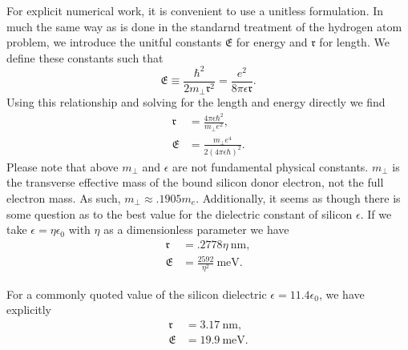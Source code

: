 For explicit numerical work, it is convenient to use a unitless formulation. In
much the same way as is done in the standarnd treatment of the hydrogen atom
problem, we introduce the unitful constants $\mathfrak{E}$ for energy and $\mathfrak{r}$ for
length. We define these constants such that
\begin{equation}
  \mathfrak{E}
  \equiv
  \frac{\hbar^2}{2 m_\perp \mathfrak{r}^2}
  =
  \frac{e^2}{8\pi \epsilon \mathfrak{r}}.
\end{equation}
Using this relationship and solving for the length and energy directly we find
\begin{align}
  \mathfrak{r}
  & =
  \frac{4\pi \epsilon \hbar^2}{m_\perp e^2},
  \\
  \mathfrak{E}
  & =
  \frac{m_\perp e^4}{2\left(4\pi\epsilon\hbar\right)^{2}}.
\end{align}
Please note that above $m_{\perp}$ and $\epsilon$ are not fundamental physical
constants. $m_{\perp}$ is the transverse effective mass of the bound silicon
donor electron, not the full electron mass. As such, $m_{\perp} \approx .1905
m_{e}$. Additionally, it seems as though there is some question as to the best
value for the dielectric constant of silicon $\epsilon$. If we take $\epsilon =
\eta \epsilon_{0}$ with $\eta$ as a dimensionless parameter we have
\begin{align}
\mathfrak{r} &= .2778\eta\>\si{\nano\metre}, \\
\mathfrak{E} &= \frac{2592}{\eta^{2}}\>\si{\milli\electronvolt}.
\end{align}

For a commonly quoted value of the silicon dielectric $\epsilon =
11.4\epsilon_{0}$, we have explicitly
\begin{align}
\mathfrak{r} &= \SI{3.17}{\nano\metre}, \\
\mathfrak{E} &= \SI{19.9}{\milli\electronvolt}.
\end{align}